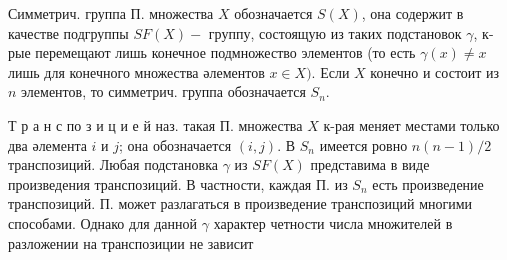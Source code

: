 \documentclass[10pt]{article}
\begin{document}
Симметрич. группа П. множества $X$ обозначается $S(X)$, она содержит в качестве подгруппы $S F(X)-$ группу, состоящую из таких подстановок $\gamma$, к-рые перемещают лишь конечное подмножество элементов (то есть $\gamma(x) \neq x$ лишь для конечного множества әлементов $x \in X)$. Если $X$ конечно и состоит из $n$ элементов, то симметрич. группа обозначается $S_{n}$.



Т р а н с по з и ц и е й наз. такая П. множества $X$ к-рая меняет местами только два әлемента $i$ и $j$; она обозначается $(i, j)$. В $S_{n}$ имеется ровно $n(n-1) / 2$ транспозиций. Любая подстановка $\gamma$ из $S F(X)$ представима в виде произведения транспозиций. В частности, каждая П. из $S_{n}$ есть произведение транспозиций. П. может разлагаться в произведение транспозиций многими способами. Однако для данной $\gamma$ характер четности числа множителей в разложении на транспозиции не зависит
\end{document}

